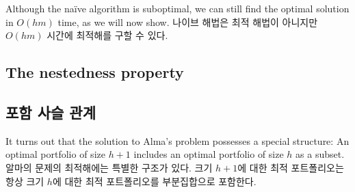 \documentclass[11pt]{article} %
\newtheorem{corollary}{Corollary}
\theoremstyle{definition}
\newtheorem{corollary}{따름정리}
\theoremstyle{definition}
\begin{document}



\ifen
Although the na\"ive algorithm is suboptimal, we can still find the optimal solution in $O(hm)$ time, as we will now show.
\else
나이브 해법은 최적 해법이 아니지만 $O(hm)$ 시간에 최적해를 구할 수 있다.
\fi

\ifen \subsection{The nestedness property}  \else \subsection{포함 사슬 관계} \fi
\ifen It turns out that the solution to Alma's problem possesses a special structure: An optimal portfolio of size $h+1$ includes an optimal portfolio of size $h$ as a subset.
\else 알마의 문제의 최적해에는 특별한 구조가 있다. 크기 $h+1$에 대한 최적 포트폴리오는 항상 크기 $h$에 대한 최적 포트폴리오를 부분집합으로 포함한다.\fi
\end{document}
